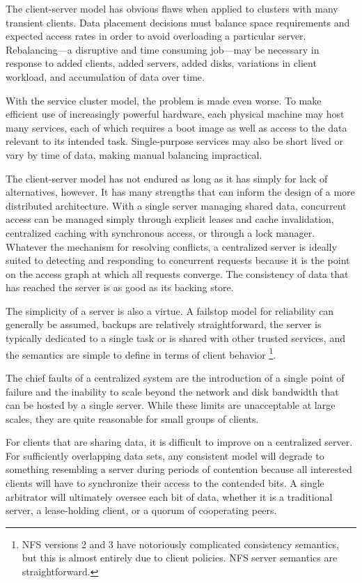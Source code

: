 The client-server model has obvious flaws when applied to clusters with many transient clients. Data placement decisions must balance space requirements and expected access rates in order to avoid overloading a particular server. Rebalancing---a disruptive and time consuming job---may be necessary in response to added clients, added servers, added disks, variations in client workload, and accumulation of data over time.

With the service cluster model, the problem is made even worse. To make efficient use of increasingly powerful hardware, each physical machine may host many services, each of which requires a boot image as well as access to the data relevant to its intended task. Single-purpose services may also be short lived or vary by time of data, making manual balancing impractical.

The client-server model has not endured as long as it has simply for lack of alternatives, however. It has many strengths that can inform the design of a more distributed architecture. With a single server managing shared data, concurrent access can be managed simply through explicit leases and cache invalidation, centralized caching with synchronous access, or through a lock manager. Whatever the mechanism for resolving conflicts, a centralized server is ideally suited to detecting and responding to concurrent requests because it is the point on the access graph at which all requests converge. The consistency of data that has reached the server is as good as its backing store.

The simplicity of a server is also a virtue. A failstop model for reliability can generally be assumed, backups are relatively straightforward, the server is typically dedicated to a single task or is shared with other trusted services, and the semantics are simple to define in terms of client behavior%
\footnote{NFS versions 2 and 3 have notoriously complicated consistency semantics, but this is almost entirely due to client policies. NFS server semantics are straightforward.}.

The chief faults of a centralized system are the introduction of a single point of failure and the inability to scale beyond the network and disk bandwidth that can be hosted by a single server. While these limits are unacceptable at large scales, they are quite reasonable for small groups of clients.

For clients that are sharing data, it is difficult to improve on a centralized server. For sufficiently overlapping data sets, any consistent model will degrade to something resembling a server during periods of contention because all interested clients will have to synchronize their access to the contended bits. A single arbitrator will ultimately oversee each bit of data, whether it is a traditional server, a lease-holding client, or a quorum of cooperating peers.

